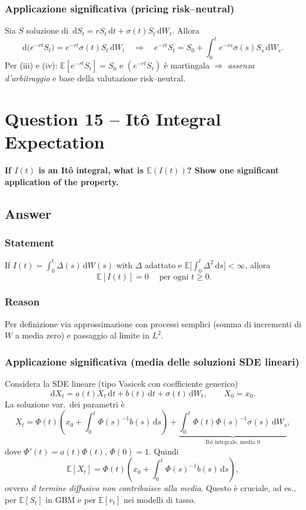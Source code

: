 \documentclass[12pt,a4paper]{book}
\theoremstyle{remark}
\newcommand{\EE}{\mathbb{E}}          %
\newcommand{\dd}{\mathrm{d}}
\begin{document}
\subsubsection*{Applicazione significativa (pricing risk–neutral)}
Sia $S$ soluzione di $\,\dd S_t = r S_t\,\dd t + \sigma(t) S_t\,\dd W_t.$ Allora
\[
\dd\big(e^{-rt}S_t\big)= e^{-rt}\sigma(t)S_t\,\dd W_t
\quad\Rightarrow\quad
e^{-rt}S_t = S_0 + \int_0^t e^{-rs}\sigma(s)S_s\,\dd W_s.
\]
Per (iii) e (iv): $\EE[e^{-rt}S_t]=S_0$ e $(e^{-rt}S_t)$ è martingala $\Rightarrow$ \emph{assenza d’arbitraggio} e base della valutazione risk–neutral.









\newpage
\section{Question 15 -- Itô Integral Expectation}
\textbf{If $I(t)$ is an It\^o integral, what is $\EE(I(t))$? Show one significant application of the property.}

\subsection*{Answer}

\subsubsection*{Statement}
If $I(t)=\displaystyle \int_0^t \Delta(s)\,\dd W(s)$ with $\Delta$ adattato e $\EE\!\big[\int_0^t \Delta^2\,\dd s\big]<\infty$, allora
\[
\boxed{\;\EE[I(t)]=0\;}\quad \text{per ogni } t\ge 0.
\]

\subsubsection*{Reason}
Per definizione via approssimazione con processi semplici (somma di incrementi di $W$ a media zero) e passaggio al limite in $L^2$.

\subsubsection*{Applicazione significativa (media delle soluzioni SDE lineari)}
Considera la SDE lineare (tipo Vasicek con coefficiente generico)
\[
\dd X_t = a(t)X_t\,\dd t + b(t)\,\dd t + \sigma(t)\,\dd W_t,\qquad X_0=x_0.
\]
La soluzione var.\ dei parametri \`e
\[
X_t = \Phi(t)\!\left(x_0 + \int_0^t \Phi(s)^{-1} b(s)\,\dd s\right)
+ \underbrace{\int_0^t \Phi(t)\Phi(s)^{-1}\sigma(s)\,\dd W_s}_{\text{It\^o integrale, media 0}},
\]
dove $\Phi'(t)=a(t)\Phi(t)$, $\Phi(0)=1$. Quindi
\[
\EE[X_t]= \Phi(t)\!\left(x_0 + \int_0^t \Phi(s)^{-1} b(s)\,\dd s\right),
\]
ovvero \emph{il termine diffusivo non contribuisce alla media}. Questo \`e cruciale, ad es., per $\EE[S_t]$ in GBM e per $\EE[r_t]$ nei modelli di tasso.
\end{document}
